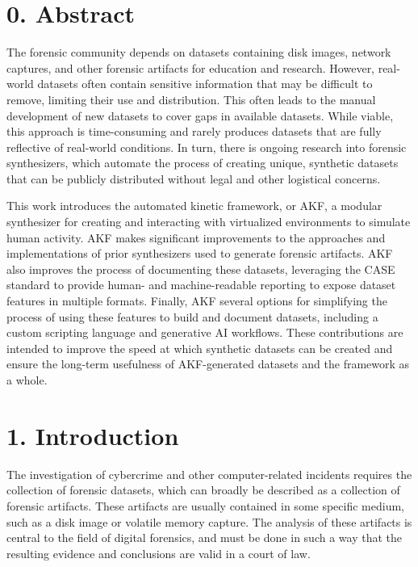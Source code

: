 \section{0. Abstract}\label{abstract}

The forensic community depends on datasets containing disk images,
network captures, and other forensic artifacts for education and
research. However, real-world datasets often contain sensitive
information that may be difficult to remove, limiting their use and
distribution. This often leads to the manual development of new datasets
to cover gaps in available datasets. While viable, this approach is
time-consuming and rarely produces datasets that are fully reflective of
real-world conditions. In turn, there is ongoing research into forensic
synthesizers, which automate the process of creating unique, synthetic
datasets that can be publicly distributed without legal and other
logistical concerns.

This work introduces the automated kinetic framework, or AKF, a modular
synthesizer for creating and interacting with virtualized environments
to simulate human activity. AKF makes significant improvements to the
approaches and implementations of prior synthesizers used to generate
forensic artifacts. AKF also improves the process of documenting these
datasets, leveraging the CASE standard to provide human- and
machine-readable reporting to expose dataset features in multiple
formats. Finally, AKF several options for simplifying the process of
using these features to build and document datasets, including a custom
scripting language and generative AI workflows. These contributions are
intended to improve the speed at which synthetic datasets can be created
and ensure the long-term usefulness of AKF-generated datasets and the
framework as a whole.

\section{1. Introduction}\label{introduction}

The investigation of cybercrime and other computer-related incidents
requires the collection of forensic datasets, which can broadly be
described as a collection of forensic artifacts. These artifacts are
usually contained in some specific medium, such as a disk image or
volatile memory capture. The analysis of these artifacts is central to
the field of digital forensics, and must be done in such a way that the
resulting evidence and conclusions are valid in a court of law.

